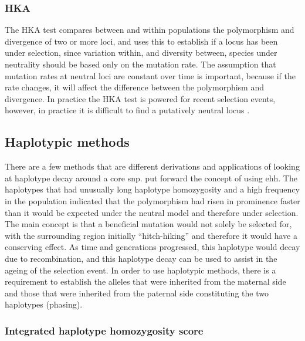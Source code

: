 \documentclass[]{report}
\begin{document}
\subsubsection{HKA}\label{hka}

The HKA test \citep{Hudson1987} compares between and within populations
the polymorphism and divergence of two or more loci, and uses this to
establish if a locus has been under selection, since variation within,
and diversity between, species under neutrality should be based only on
the mutation rate. The assumption that mutation rates at neutral loci
are constant over time is important, because if the rate changes, it
will affect the difference between the polymorphism and divergence. In
practice the HKA test is powered for recent selection events, however,
in practice it is difficult to find a putatively neutral locus
\citep{Zhai2009}.

\subsection{Haplotypic methods}\label{haplotypic-methods}

There are a few methods that are different derivations and applications
of looking at haplotype decay around a core \gls{snp}.
\citet{sabeti2006positive} put forward the concept of using \gls{ehh}.
The haplotypes that had unusually long haplotype homozygosity and a high
frequency in the population indicated that the polymorphism had risen in
prominence faster than it would be expected under the neutral model and
therefore under selection. The main concept is that a beneficial
mutation would not solely be selected for, with the surrounding region
initially ``hitch-hiking'' and therefore it would have a conserving
effect. As time and generations progressed, this haplotype would decay
due to recombination, and this haplotype decay can be used to assist in
the ageing of the selection event. In order to use haplotypic methods,
there is a requirement to establish the alleles that were inherited from
the maternal side and those that were inherited from the paternal side
constituting the two haplotypes (phasing).

\subsubsection{Integrated haplotype homozygosity
score}\label{integrated-haplotype-homozygosity-score}
\end{document}
